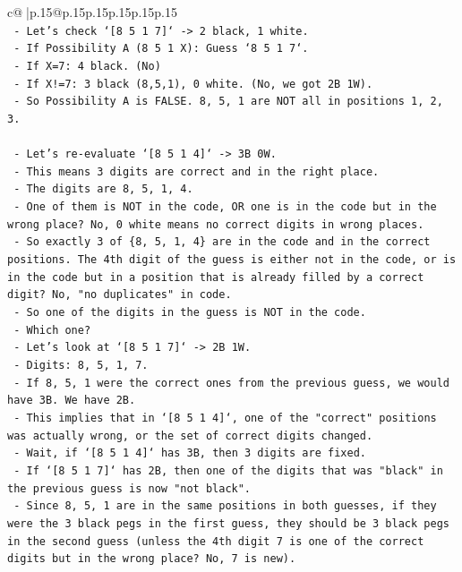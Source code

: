 \documentclass{article}
\begin{document}
{\begin{supertabular}{c@{$\;$}|p{.15\linewidth}@{}p{.15\linewidth}p{.15\linewidth}p{.15\linewidth}p{.15\linewidth}p{.15\linewidth}}
{{{\\ 
\texttt{    {-} Let's check `{[}8 5 1 7{]}` {-}> 2 black, 1 white.} \\
\texttt{      {-} If Possibility A (8 5 1 X): Guess `8 5 1 7`.} \\
\texttt{        {-} If X=7: 4 black. (No)} \\
\texttt{        {-} If X!=7: 3 black (8,5,1), 0 white. (No, we got 2B 1W).} \\
\texttt{        {-} So Possibility A is FALSE. 8, 5, 1 are NOT all in positions 1, 2, 3.} \\
\\ 
\texttt{    {-} Let's re{-}evaluate `{[}8 5 1 4{]}` {-}> 3B 0W.} \\
\texttt{      {-} This means 3 digits are correct and in the right place.} \\
\texttt{      {-} The digits are 8, 5, 1, 4.} \\
\texttt{      {-} One of them is NOT in the code, OR one is in the code but in the wrong place? No, 0 white means no correct digits in wrong places.} \\
\texttt{      {-} So exactly 3 of \{8, 5, 1, 4\} are in the code and in the correct positions. The 4th digit of the guess is either not in the code, or is in the code but in a position that is already filled by a correct digit? No, "no duplicates" in code.} \\
\texttt{      {-} So one of the digits in the guess is NOT in the code.} \\
\texttt{      {-} Which one?} \\
\texttt{      {-} Let's look at `{[}8 5 1 7{]}` {-}> 2B 1W.} \\
\texttt{        {-} Digits: 8, 5, 1, 7.} \\
\texttt{        {-} If 8, 5, 1 were the correct ones from the previous guess, we would have 3B. We have 2B.} \\
\texttt{        {-} This implies that in `{[}8 5 1 4{]}`, one of the "correct" positions was actually wrong, or the set of correct digits changed.} \\
\texttt{        {-} Wait, if `{[}8 5 1 4{]}` has 3B, then 3 digits are fixed.} \\
\texttt{        {-} If `{[}8 5 1 7{]}` has 2B, then one of the digits that was "black" in the previous guess is now "not black".} \\
\texttt{        {-} Since 8, 5, 1 are in the same positions in both guesses, if they were the 3 black pegs in the first guess, they should be 3 black pegs in the second guess (unless the 4th digit 7 is one of the correct digits but in the wrong place? No, 7 is new).} \\
}}}
\end{supertabular}}
\end{document}
